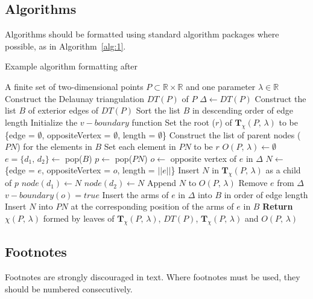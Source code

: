 \documentclass{josis}
\begin{document}
\subsection{Algorithms}

Algorithms should be formatted using standard algorithm packages where possible, as in Algorithm~\ref{alg:1}. 

\begin{algorithm}[htb]
\caption{Example algorithm formatting after \cite{zhong16.IJGIS}} \label{alg:1}
\footnotesize
\begin{algorithmic} [1]                   %
\Require A finite set of two-dimensional points $P \subset \mathbb{R} \times \mathbb{R}$ and one parameter $\lambda \in \mathbb{R}$
\State Construct the Delaunay triangulation $DT(P)$ of $P$
\State $\Delta \gets DT(P)$
\State Construct the list $B$ of exterior edges of $DT(P)$
\State Sort the list $B$ in descending order of edge length
\State Initialize the $v\!-\!boundary$ function
\State Set the root ($r$) of $\mathbf{T}_{{\chi}}(P,\, \lambda)$ to be \{edge = $\emptyset$, oppositeVertex = $\emptyset$, length = $\emptyset$\} 
\State Construct the list of parent nodes ($PN$) for the elements in $B$
\State Set each element in $PN$ to be $r$
\State $O(P,\, \lambda) \gets \emptyset$
	\State $e = \{d_1,\, d_2\} \gets$ pop($B$)
	\State $p \gets$ pop($PN$)
	\State $o \gets$ opposite vertex of $e$ in $\Delta$
	\State $N \gets$ \{edge = $e$, oppositeVertex = $o$, length = $||e||$\}
	\State Insert $N$ in $\mathbf{T}_{{\chi}}(P,\, \lambda)$ as a child of $p$
	\State $node(d_1) \gets N$
	\State $node(d_2) \gets N$
	\State Append $N$ to $O(P,\, \lambda)$
		\State Remove $e$ from $\Delta$
		\State $v\!-\!boundary(o) = true$
		\State Insert the arms of $e$ in $\Delta$ into $B$ in order of edge length
		\State Insert $N$ into $PN$ at the corresponding position of the arms of $e$ in $B$ 
	\EndIf
\EndWhile
\State \textbf{Return} $\chi(P,\, \lambda)$ formed by leaves of $\mathbf{T}_{{\chi}}(P,\, \lambda)$, $DT(P)$, $\mathbf{T}_{{\chi}}(P,\, \lambda)$ and $O(P,\, \lambda)$
\end{algorithmic}
\end{algorithm}

\subsection{Footnotes}
Footnotes are strongly discouraged in text. Where footnotes must be used, they should be numbered consecutively. 
\end{document}
